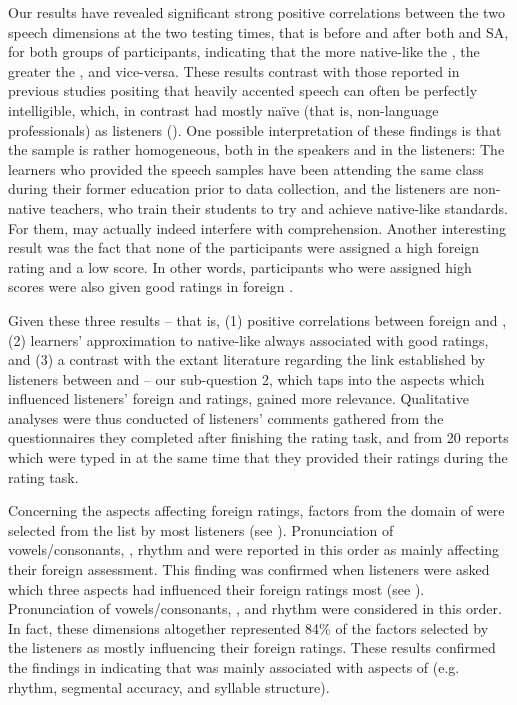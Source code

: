 \documentclass[output=paper]{langsci/langscibook}
\begin{document}
Our results have revealed significant strong positive correlations between the two speech dimensions at the two testing times, that is before and after both  and SA, for both groups of participants, indicating that the more native-like the , the greater the , and vice-versa. These results contrast with those reported in previous studies positing that heavily accented speech can often be perfectly intelligible, which, in contrast had mostly naïve (that is, non-language professionals)  as listeners (\citealt{MunroDerwing1995,MunroDerwing1999,DerwingMunro1997,GallardodelPuertoEtAl2007,Hayes-HarbWatzinger-Tharp2012}). One possible interpretation of these findings is that the sample is rather homogeneous, both in the speakers and in the listeners: The learners who provided the speech samples have been attending the same  class during their former education prior to data collection, and the listeners are non-native  teachers, who train their students to try and achieve native-like standards. For them,  may actually indeed interfere with comprehension. Another interesting result was the fact that none of the participants were assigned a high foreign  rating and a low  score. In other words, participants who were assigned high  scores were also given good ratings in foreign .

Given these three results – that is, 
(1) positive correlations between foreign  and , 
(2) learners’ approximation to native-like  always associated with good  ratings, and (3) a contrast with the extant literature regarding the link established by listeners between  and  – our sub-question 2, which taps into the aspects which influenced listeners’ foreign  and  ratings, gained more relevance. Qualitative analyses were thus conducted of listeners’ comments gathered from the questionnaires they completed after finishing the rating task, and from 20 reports which were typed in at the same time that they provided their ratings during the rating task. 

Concerning the aspects affecting foreign  ratings, factors from the domain of  were selected from the list by most listeners (see ). Pronunciation of vowels/consonants, , rhythm and  were reported in this order as mainly affecting their foreign  assessment. This finding was confirmed when listeners were asked which three aspects had influenced their foreign  ratings most (see ). Pronunciation of vowels/consonants, ,  and rhythm were considered in this order. In fact, these  dimensions altogether represented 84\% of the factors selected by the listeners as mostly influencing their foreign  ratings. These results confirmed the findings in \citet{TrofimovichIsaacs2012} indicating that  was mainly associated with aspects of  (e.g. rhythm, segmental accuracy, and syllable structure).
\end{document}

